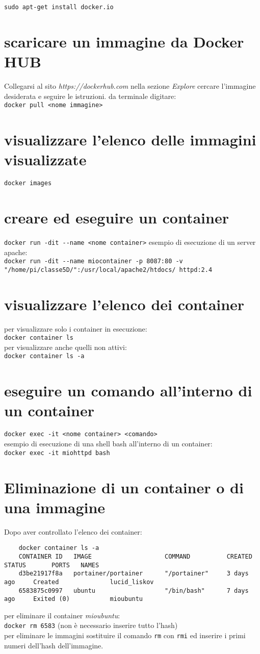 \documentclass[10pt,a4paper]{report}
\begin{document}
	\verb|sudo apt-get install docker.io|
	\section{scaricare un immagine da Docker HUB}
	Collegarsi al sito \textit{https://dockerhub.com} 
	nella sezione \textit{Explore} cercare l'immagine desiderata  e seguire le istruzioni.
	da terminale digitare:\\
	\verb|docker pull <nome immagine>|
	\section{visualizzare l'elenco delle immagini visualizzate}
    \verb|docker images|
	\section{creare ed eseguire un container}
	\verb|docker run -dit --name <nome container>|
	esempio di esecuzione di un server apache:\\
	\verb|docker run -dit --name miocontainer -p 8087:80 -v "/home/pi/classe5D/":/usr/local/apache2/htdocs/ httpd:2.4| 
	\section{visualizzare l'elenco dei container}
	per visualizzare solo i container in esecuzione:\\
	\verb|docker container ls|\\
	per visualizzare anche quelli non attivi:\\
	\verb|docker container ls -a|
	\section{eseguire un comando all'interno di un container}
	\verb|docker exec -it <nome container> <comando>|\\esempio di esecuzione di una shell bash all'interno di un container:\\
	\verb|docker exec -it miohttpd bash | 
	\section{Eliminazione di un container o di una immagine}
	Dopo aver controllato l'elenco dei container:
	\begin{verbatim}
	docker container ls -a
	CONTAINER ID   IMAGE                    COMMAND          CREATED        STATUS       PORTS   NAMES
	d3be21917f8a   portainer/portainer      "/portainer"     3 days ago     Created              lucid_liskov
	6583875c0997   ubuntu                   "/bin/bash"      7 days ago     Exited (0)           mioubuntu
	\end{verbatim}
	per eliminare il container \textit{mioubuntu}:\\
	\verb|docker rm 6583| (non è necessario inserire tutto l'hash)\\
	per eliminare le immagini sostituire il comando \verb|rm| con \verb|rmi| ed inserire i primi numeri dell'hash dell'immagine.
	
\end{document}
